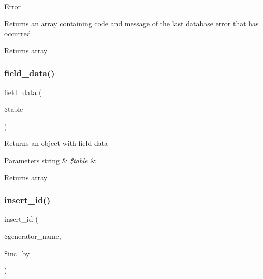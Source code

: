 Error

Returns an array containing code and message of the last database error that has occurred.

\begin{DoxyReturn}{Returns}
array 
\end{DoxyReturn}
\mbox{\label{class_c_i___d_b__ibase__driver_a90355121e1ed009e0efdbd544ab56efa}} 
\subsubsection{\texorpdfstring{field\+\_\+data()}{field\_data()}}
{\footnotesize\ttfamily field\+\_\+data (\begin{DoxyParamCaption}\item[{}]{\$table }\end{DoxyParamCaption})}

Returns an object with field data


\begin{DoxyParams}[1]{Parameters}
string & {\em \$table} & \\
\hline
\end{DoxyParams}
\begin{DoxyReturn}{Returns}
array 
\end{DoxyReturn}
\mbox{\label{class_c_i___d_b__ibase__driver_a148521f11a2aad9f228af62f59ec5130}} 
\subsubsection{\texorpdfstring{insert\+\_\+id()}{insert\_id()}}
{\footnotesize\ttfamily insert\+\_\+id (\begin{DoxyParamCaption}\item[{}]{\$generator\+\_\+name,  }\item[{}]{\$inc\+\_\+by = {} }\end{DoxyParamCaption})}

